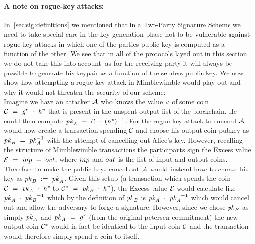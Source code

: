 \paragraph{A note on rogue-key attacks:} In~\cref{sec:sig:definitions} we mentioned that in a Two-Party Signature Scheme we need to take special care in the key generation phase not to be vulnerable against rogue-key attacks in which one of the parties public key is computed as a function of the other.
We see that in all of the protocols layed out in this section we do not take this into account, as for the receiving party it will always be possible to generate his keypair as a function of the senders public key.
We now show how attempting a rogue-key attack in Mimblewimble would play out and why it would not threaten the security of our scheme:\\
Imagine we have an attacker $\mathcal{A}$ who knows the value $\mathit{v}$ of some coin $\mathcal{C} ~=~ \mathit{g}^{\mathit{r}} ~\cdot~ \mathit{h}^{\mathit{v}}$ that is present in the unspent output list of the blockchain.
He could then compute $\mathit{pk}_{\mathit{A}} ~=~ \mathcal{C} ~\cdot~ {(\mathit{h}^{\mathit{v}}})^{-1}$.
For the rogue-key attack to succeed $\mathcal{A}$ would now create a transaction spending $\mathcal{C}$ and choose his output coin pubkey as $\mathit{pk}_{\mathit{B}} ~=~ \mathit{pk}_{\mathit{A}}^{-1}$ with the attempt of cancelling out Alice's key.
However, recalling the structure of Mimblewimble transactions the participants sign the Excess value $\mathcal{E} ~=~ inp ~-~ out$, where $inp$ and $out$ is the list of input and output coins.
Therefore to make the public keys cancel out $\mathcal{A}$ would instead have to choose his key as $\mathit{pk}_{\mathit{B}} ~:=~ \mathit{pk}_{\mathit{A}}$.
Given this setup (a transaction which spends the coin $\mathcal{C} ~=~ \mathit{pk}_{\mathit{A}} ~\cdot~ \mathit{h}^{\mathit{v}}$ to $\mathcal{C}^* ~=~ \mathit{pk}_{\mathit{B}} ~\cdot~\mathit{h}^{\mathit{v}}$), the Excess value $\mathcal{E}$ would calculate like $\mathit{pk}_{\mathit{A}} ~\cdot~ {\mathit{pk}_{\mathit{B}}}^{-1}$ which by the definition of $\mathit{pk}_{\mathit{B}}$ is $\mathit{pk}_{\mathit{A}} ~\cdot~ {\mathit{pk}_{\mathit{A}}}^{-1}$ which would cancel out and allow the adversary to forge a signature.
However, since we chose $\mathit{pk}_{\mathit{B}}$ as simply $\mathit{pk}_{\mathit{A}}$ and $\mathit{pk}_{\mathit{A}} ~=~ \mathit{g}^{\mathit{r}}$ (from the original petersen commitment) the new output coin $\mathcal{C}^*$ would in fact be identical to the input coin $\mathcal{C}$ and the transaction would therefore simply spend a coin to itself.
